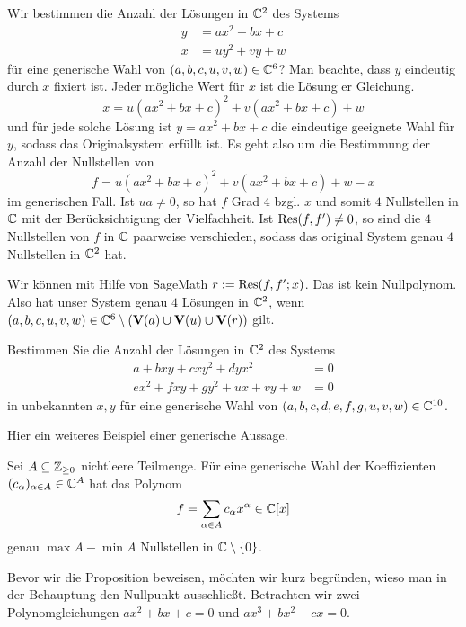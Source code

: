 \documentclass[11pt]{article}
\numberwithin{equation}{section}
\begin{document}
\begin{beispiel} 
	Wir bestimmen die Anzahl der Lösungen in  $\mathbb{C}^2$ des Systems 
	\begin{align*}
		y & = a x^2 + b x + c
		\\ x & = u y^2 + v y + w 
	\end{align*}
	für eine generische Wahl von $(a,b,c,u,v,w) \in \mathbb{C}^6$? Man beachte, dass $y$ eindeutig durch $x$ fixiert ist. 
	Jeder mögliche Wert für $x$  ist die Lösung er Gleichung. 
	\[
	x = u (a x^2 + b x+ c)^2 + v (a x^2 + b x + c) + w
	\]
	und für jede solche Lösung ist $y = a x^2 + b x + c$ die eindeutige geeignete Wahl für $y$, sodass das Originalsystem erfüllt ist. Es geht also um die Bestimmung der Anzahl der Nullstellen von 
	\[
	f = u (a x^2 + b x+ c)^2 + v (a x^2 + b x + c) + w - x 
	\]
	im generischen Fall. Ist $u a \ne 0$, so hat $f$  Grad $4$ bzgl. $x$ und somit $4$ Nullstellen in $\mathbb{C}$ mit der Berücksichtigung der Vielfachheit. Ist $\operatorname{Res}(f,f') \ne 0$, so sind die $4$ Nullstellen von $f$ in $\mathbb{C}$ paarweise verschieden, sodass das original System genau $4$ Nullstellen in $\mathbb{C}^2$ hat. 
	
	Wir können mit Hilfe von SageMath $r:=\operatorname{Res}(f,f';x)$. Das ist kein Nullpolynom. Also hat unser System genau $4$ Lösungen in $\mathbb{C}^2$, wenn $(a,b,c,u,v,w) \in \mathbb{C}^6 \setminus (\mathbf{V}(a) \cup \mathbf{V}(u) \cup \mathbf{V}(r))$ gilt. 
\end{beispiel} 

\begin{aufgabe} 
	Bestimmen Sie die Anzahl der Lösungen in $\mathbb{C}^2$ des Systems 
	\begin{align*}
		a + b x y + c x y^2 + d y x^2 & = 0
		\\		 e x^2 + f x y + g y^2 +  u  x + v y + w & = 0
	\end{align*} 
	in unbekannten $x,y$ für eine generische Wahl von $(a,b,c,d,e,f,g,u,v,w) \in \mathbb{C}^{10}$. 
\end{aufgabe} 

Hier ein weiteres Beispiel einer generische Aussage. 

\begin{proposition}
	Sei $A \subseteq \mathbb{Z}_{\ge 0}$ nichtleere Teilmenge. Für eine generische Wahl der Koeffizienten $(c_\alpha)_{\alpha \in A} \in \mathbb{C}^A$ hat das Polynom 
	\[
	f= \sum_{\alpha \in A} c_\alpha x^\alpha \in \mathbb{C}[x]
	\]
	genau $\max A - \min A$ Nullstellen in $\mathbb{C} \setminus \{0\}$. 
\end{proposition} 

Bevor wir die Proposition beweisen, möchten wir kurz begründen, wieso man in der Behauptung den Nullpunkt ausschließt. Betrachten wir zwei Polynomgleichungen $a x^2 + b x + c =0$ und $a x^3 + b x^2 + c x =0$. 
\end{document}
